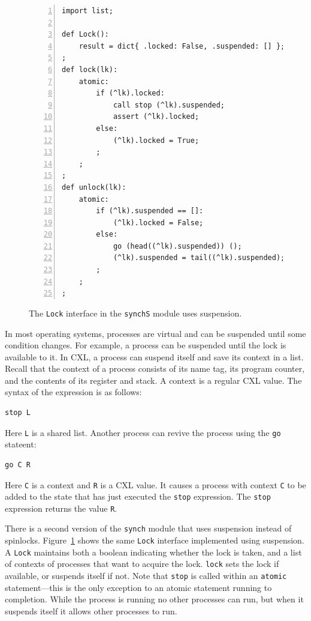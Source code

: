 \documentclass{report}
\newenvironment{code}{
\tcolorbox
}{
\endtcolorbox
}
\begin{document}
\begin{figure}
\begin{code}
\begin{Verbatim}[xleftmargin=5mm,numbers=left]
import list;

def Lock():
    result = dict{ .locked: False, .suspended: [] };
;
def lock(lk):
    atomic:
        if (^lk).locked:
            call stop (^lk).suspended;
            assert (^lk).locked;
        else:
            (^lk).locked = True;
        ;
    ;
;
def unlock(lk):
    atomic:
        if (^lk).suspended == []:
            (^lk).locked = False;
        else:
            go (head((^lk).suspended)) ();
            (^lk).suspended = tail((^lk).suspended);
        ;
    ;
;
\end{Verbatim}
\end{code}
\caption{The \texttt{Lock} interface in the \texttt{synchS} module uses suspension.}
\label{fig:suspension}
\end{figure}

In most operating systems, processes are virtual and can be suspended
until some condition changes.  For example, a process can be suspended
until the lock is available to it.
In CXL, a process can suspend itself and save its context in a
list.  Recall that the context of a process consists of its name tag,
its program counter, and the contents of its register and stack.
A context is a regular CXL value.
The syntax of the expression is as follows:

\begin{code}
\begin{verbatim}
stop L
\end{verbatim}
\end{code}

Here \texttt{L} is a shared list.
Another process can revive the process using the \texttt{go} stateent:

\begin{code}
\begin{verbatim}
go C R
\end{verbatim}
\end{code}

Here \texttt{C} is a context and \texttt{R} is a CXL value.
It causes a process with context \texttt{C} to be added to the state that has
just executed the \texttt{stop} expression.  The \texttt{stop} expression
returns the value \texttt{R}.

There is a second version of the \texttt{synch} module that uses suspension
instead of spinlocks.
Figure~\ref{fig:suspension} shows the same \texttt{Lock} interface implemented
using suspension.
A \texttt{Lock} maintains both a boolean indicating whether the lock is taken,
and a list of contexts of processes that want to acquire the lock.
\texttt{lock} sets the lock if available, or suspends itself if not.
Note that \texttt{stop} is called within an \texttt{atomic} statement---this is
the only exception to an atomic statement running to completion.  While the
process is running no other processes can run, but when it suspends itself
it allows other processes to run.
\end{document}

